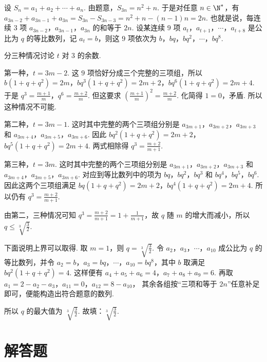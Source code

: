 \begin{solution}
设 \(S_n=a_1+a_2+\cdots+a_n\). 由题意，\(S_{3n}=n^2+n\). 于是对任意 \(n\in\N^*\)，有 \(a_{3n-2}+a_{3n-1}+a_{3n}=S_{3n}-S_{3n-3}=n^2+n-\left( n-1 \right)n=2n\).
也就是说，每连续 \(3\) 项 \(a_{3n-2}\)，\(a_{3n-1}\)，\(a_{3n}\) 的和等于 \(2n\).
设某连续 \(9\) 项 \(a_t\)，\(a_{t+1}\)，\(\cdots\)，\(a_{t+8}\) 是公比为 \(q\) 的等比数列，记 \(a_t=b\)，则这 \(9\) 项依次为 \(b\)，\(bq\)，\(bq^2\)，\(\cdots\)，\(bq^8\).

分三种情况讨论 \(t\) 对 \(3\) 的余数.

第一种，\(t=3m-2\). 这 \(9\) 项恰好分成三个完整的三项组，所以 \(b\left( 1+q+q^2 \right)=2m\)，\(bq^3\left( 1+q+q^2 \right)=2m+2\)，\(bq^6\left( 1+q+q^2 \right)=2m+4\). 于是 \(q^3=\frac{m+1}{m}\)，\(q^6=\frac{m+2}{m}\). 但这要求 \(\left( \frac{m+1}{m} \right)^2=\frac{m+2}{m}\).
化简得 \(1=0\)，矛盾. 所以这种情况不可能.

第二种，\(t=3m-1\). 这时其中完整的两个三项组分别是 \(a_{3m+1}\)，\(a_{3m+2}\)，\(a_{3m+3}\) 和 \(a_{3m+4}\)，\(a_{3m+5}\)，\(a_{3m+6}\). 因此 \(bq^2\left( 1+q+q^2 \right)=2m+2\)，\(bq^5\left( 1+q+q^2 \right)=2m+4\). 两式相除得 \(q^3=\frac{m+2}{m+1}\).

第三种，\(t=3m\). 这时其中完整的两个三项组分别是 \(a_{3m+1}\)，\(a_{3m+2}\)，\(a_{3m+3}\) 和 \(a_{3m+4}\)，\(a_{3m+5}\)，\(a_{3m+6}\). 对应到等比数列中的项为 \(bq\)，\(bq^2\)，\(bq^3\) 和 \(bq^4\)，\(bq^5\)，\(bq^6\). 因此这两个三项组满足 \(bq\left( 1+q+q^2 \right)=2m+2\)，\(bq^4\left( 1+q+q^2 \right)=2m+4\). 所以仍有 \(q^3=\frac{m+2}{m+1}\).

由第二，三种情况可知 \(q^3=\frac{m+2}{m+1}=1+\frac{1}{m+1}\)，故 \(q\) 随 \(m\) 的增大而减小，所以 \(q\le \sqrt[3]{\frac{3}{2}}\).

下面说明上界可以取得. 取 \(m=1\)，则 \(q=\sqrt[3]{\frac{3}{2}}\). 令 \(a_2\)，\(a_3\)，\(\cdots\)，\(a_{10}\) 成公比为 \(q\) 的等比数列，并令 \(a_2=b\)，\(a_3=bq\)，\(\cdots\)，\(a_{10}=bq^8\)，其中 \(b\) 取满足 \(bq^2\left( 1+q+q^2 \right)=4\).
这样便有 \(a_4+a_5+a_6=4\)，\(a_7+a_8+a_9=6\). 再取 \(a_1=2-a_2-a_3\)，\(a_{11}=0\)，\(a_{12}=8-a_{10}\)，
其余各组按“三项和等于 \(2n\)”任意补足即可，便能构造出符合题意的数列.

所以 \(q\) 的最大值为 \(\sqrt[3]{\frac{3}{2}}\). 故填：\(\sqrt[3]{\frac{3}{2}}\).
\end{solution}
\section{解答题}

